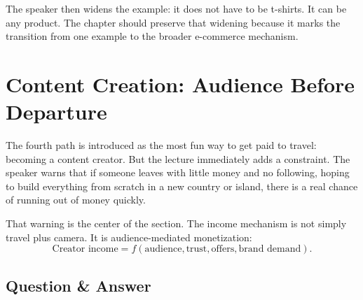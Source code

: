 \begin{figure}
\centering
{}
\end{figure}

The speaker then widens the example: it does not have to be t-shirts. It can be any product. The chapter should preserve that widening because it marks the transition from one example to the broader e-commerce mechanism.

\section{Content Creation: Audience Before Departure}

The fourth path is introduced as the most fun way to get paid to travel: becoming a content creator. But the lecture immediately adds a constraint. The speaker warns that if someone leaves with little money and no following, hoping to build everything from scratch in a new country or island, there is a real chance of running out of money quickly.

That warning is the center of the section. The income mechanism is not simply travel plus camera. It is audience-mediated monetization:
\begin{equation}
\text{Creator income}
=
f(\text{audience},\text{trust},\text{offers},\text{brand demand}).
\end{equation}

\subsection{Question \& Answer}

